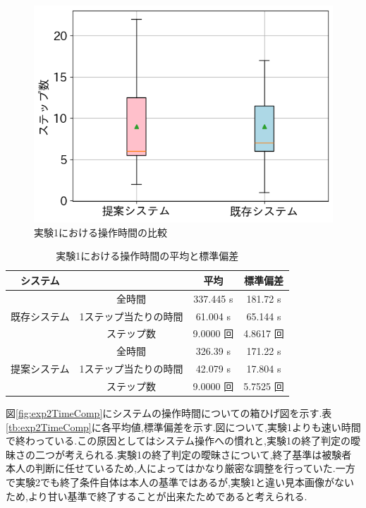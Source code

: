 \begin{figure}[h]
\begin{minipage}[b]{0.48\linewidth}
  \includegraphics[scale=0.4]{./imgs/result/cakeStepCnt.png}
 \end{minipage}
 \caption{実験1における操作時間の比較}\label{fig:exp1TimeComp}
\end{figure}

\begin{table}[h]
	\centering
	\caption{実験1における操作時間の平均と標準偏差\label{tb:exp1TimeComp}}
		\begin{tabular}{|c|c|c|c|} \hline
                システム&&平均&標準偏差\\ \hline\hline
                \multirow{3}{*}{既存システム}&全時間&337.445 s&181.72 s \\ \cline{2-4}
                &1ステップ当たりの時間&61.004 s&65.144 s \\ \cline{2-4}
                &ステップ数&9.0000 回&4.8617 回 \\ \hline
                \multirow{3}{*}{提案システム}&全時間&326.39 s&171.22 s \\ \cline{2-4}
                &1ステップ当たりの時間&42.079 s&17.804 s \\ \cline{2-4}
                &ステップ数&9.0000 回&5.7525 回 \\ \hline
		\end{tabular}
\end{table}
\newpage

図\ref{fig:exp2TimeComp}にシステムの操作時間についての箱ひげ図を示す.表\ref{tb:exp2TimeComp}に各平均値,標準偏差を示す.図\label{fig:exp2AllTime}について,実験1よりも速い時間で終わっている.この原因としてはシステム操作への慣れと,実験1の終了判定の曖昧さの二つが考えられる.実験1の終了判定の曖昧さについて,終了基準は被験者本人の判断に任せているため,人によってはかなり厳密な調整を行っていた.一方で実験2でも終了条件自体は本人の基準ではあるが,実験1と違い見本画像がないため,より甘い基準で終了することが出来たためであると考えられる.


